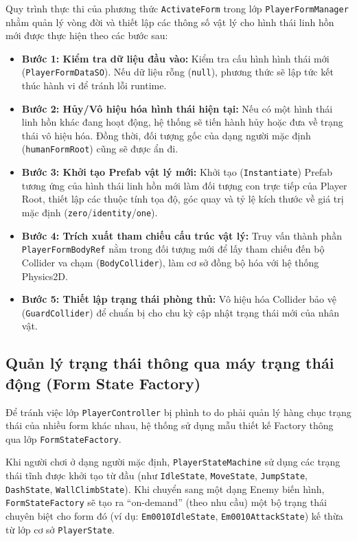 \documentclass[../DoAn.tex]{subfiles}
\begin{document}
Quy trình thực thi của phương thức \texttt{ActivateForm} trong lớp \texttt{PlayerFormManager} nhằm quản lý vòng đời và thiết lập các thông số vật lý cho hình thái linh hồn mới được thực hiện theo các bước sau:
\begin{itemize}
    \item \textbf{Bước 1: Kiểm tra dữ liệu đầu vào:} Kiểm tra cấu hình hình thái mới (\texttt{PlayerFormDataSO}). Nếu dữ liệu rỗng (\texttt{null}), phương thức sẽ lập tức kết thúc hành vi để tránh lỗi runtime.
    \item \textbf{Bước 2: Hủy/Vô hiệu hóa hình thái hiện tại:} Nếu có một hình thái linh hồn khác đang hoạt động, hệ thống sẽ tiến hành hủy hoặc đưa về trạng thái vô hiệu hóa. Đồng thời, đối tượng gốc của dạng người mặc định (\texttt{humanFormRoot}) cũng sẽ được ẩn đi.
    \item \textbf{Bước 3: Khởi tạo Prefab vật lý mới:} Khởi tạo (\texttt{Instantiate}) Prefab tương ứng của hình thái linh hồn mới làm đối tượng con trực tiếp của Player Root, thiết lập các thuộc tính tọa độ, góc quay và tỷ lệ kích thước về giá trị mặc định (\texttt{zero}/\texttt{identity}/\texttt{one}).
    \item \textbf{Bước 4: Trích xuất tham chiếu cấu trúc vật lý:} Truy vấn thành phần \texttt{PlayerFormBodyRef} nằm trong đối tượng mới để lấy tham chiếu đến bộ Collider va chạm (\texttt{BodyCollider}), làm cơ sở đồng bộ hóa với hệ thống Physics2D.
    \item \textbf{Bước 5: Thiết lập trạng thái phòng thủ:} Vô hiệu hóa Collider bảo vệ (\texttt{GuardCollider}) để chuẩn bị cho chu kỳ cập nhật trạng thái mới của nhân vật.
\end{itemize}

\subsection{Quản lý trạng thái thông qua máy trạng thái động (Form State Factory)}
Để tránh việc lớp \texttt{PlayerController} bị phình to do phải quản lý hàng chục trạng thái của nhiều form khác nhau, hệ thống sử dụng mẫu thiết kế Factory thông qua lớp \texttt{FormStateFactory}. 

Khi người chơi ở dạng người mặc định, \texttt{PlayerStateMachine} sử dụng các trạng thái tĩnh được khởi tạo từ đầu (như \texttt{IdleState}, \texttt{MoveState}, \texttt{JumpState}, \texttt{DashState}, \texttt{WallClimbState}). Khi chuyển sang một dạng Enemy biến hình, \texttt{FormStateFactory} sẽ tạo ra ``on-demand'' (theo nhu cầu) một bộ trạng thái chuyên biệt cho form đó (ví dụ: \texttt{Em0010IdleState}, \texttt{Em0010AttackState}) kế thừa từ lớp cơ sở \texttt{PlayerState}.
\end{document}
